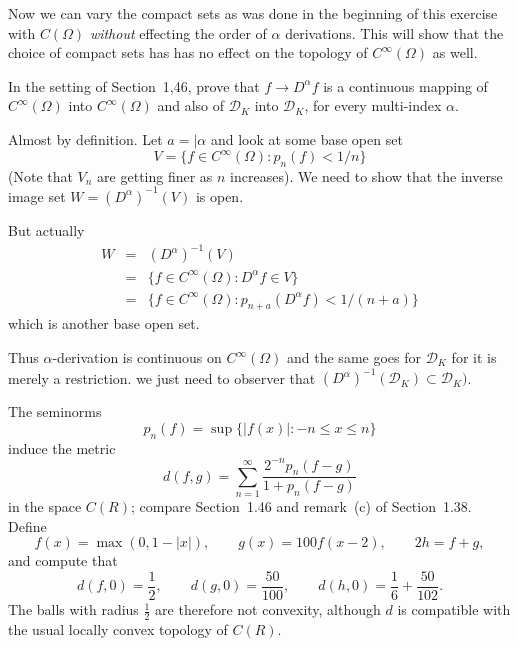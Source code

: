 \begin{enumerate}
Now we can vary the compact sets as was done 
in the beginning of this exercise with \(C(\Omega)\)
\emph{without} effecting the order of \(\alpha\) derivations.
This will show that the choice of compact sets has 
has no effect on the topology of \(C^\infty(\Omega)\) as well.

\begin{excopy}
In the setting of Section~1,46, prove that \(f\rightarrow D^\alpha f\)
is a continuous mapping of 
\(C^\infty(\Omega)\) into \(C^\infty(\Omega)\)  and also of
\(\mathcal{D}_K\) into \(\mathcal{D}_K\),
for every multi-index \(\alpha\).
\end{excopy}

Almost by definition. Let \(a=|\alpha\) and look at some base open set
\begin{equation*}
 V = \{f\in C^\infty(\Omega): p_n(f)< 1/n\}
\end{equation*}
(Note that \(V_n\) are getting finer as $n$ increases).
We need to show that the inverse image set \(W = (D^\alpha)^{-1}(V)\) is open.

But actually
\begin{eqnarray*}
 W 
 &=&  (D^\alpha)^{-1}(V) \\
 &=&  \{f\in C^\infty(\Omega): D^\alpha f \in V\} \\
 &=&  \{f\in C^\infty(\Omega): p_{n+a}(D^\alpha f)< 1/(n+a)\}
\end{eqnarray*}
which is another base open set.

Thus \(\alpha\)-derivation is continuous on \(C^\infty(\Omega)\)
and the same goes for \(\mathcal{D}_K\) for it is merely
a restriction. we just need to observer that 
\((D^\alpha)^{-1}(\mathcal{D}_K) \subset \mathcal{D}_K)\).



\begin{excopy}
The seminorms
\begin{equation*}
 p_n(f) = \sup\{|f(x)|: -n \leq x \leq n\}
\end{equation*}
induce the metric
\begin{equation*}
  d(f,g) = \sum_{n=1}^\infty \frac{2^{-n} p_n(f-g)}{1 +  p_n(f-g)}
\end{equation*}
in the space \(C(R)\); compare Section~1.46 and remark~(c) of
Section~1.38.
Define
\begin{equation*}
 f(x) = \max(0,1-|x|), \qquad g(x) = 100f(x-2), \qquad 2h = f+g,
\end{equation*}
and compute that
\begin{equation*}
 d(f,0)=\frac{1}{2}, \qquad d(g,0) = \frac{50}{100}, 
                     \qquad d(h,0) = \frac{1}{6}+\frac{50}{102}.
\end{equation*}
The balls with radius \(\frac{1}{2}\) are therefore not convexity, although $d$
is compatible  with the usual locally convex topology of \(C(R)\).
\end{excopy}


\end{enumerate}
